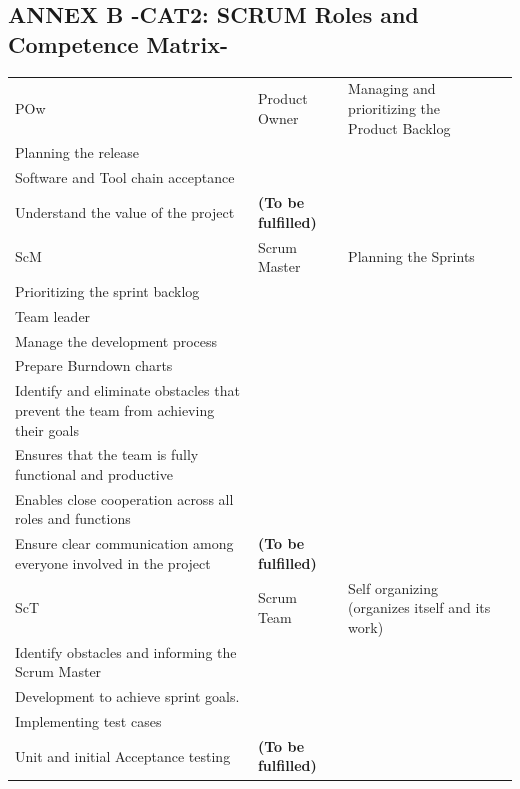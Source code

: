 \documentclass{template/openetcs_article}
\begin{document}
\begin{landscape}
\newpage
\subsection{ANNEX B -CAT2: SCRUM Roles and Competence Matrix-}
\begin{flushleft}
\begin{supertabular}[H]{|m{1cm}|m{4cm}|m{13cm}|m{7cm}|}
\hline
POw &
Product Owner &
\raggedright
Managing and prioritizing the Product Backlog\\
Planning the release\\
Software and Tool chain acceptance\\
Understand the value of the project
&
\textbf{(To be fulfilled)} \\\hline
ScM &
Scrum Master &
\raggedright
Planning the Sprints\\
Prioritizing the sprint backlog\\
Team leader\\
Manage the development process \\
Prepare Burndown charts\\
Identify and eliminate obstacles that prevent the team from achieving their goals \\
Ensures that the team is fully functional and productive\\
Enables close cooperation across all roles and functions\\
Ensure clear communication among everyone involved in the project
&
\textbf{(To be fulfilled)} \\\hline
ScT &
Scrum Team &
\raggedright
Self organizing (organizes itself and its work)\\
Identify obstacles and informing the Scrum Master \\
Development to achieve sprint goals.\\ 
Implementing test cases \\
Unit and initial Acceptance testing 
&
\textbf{(To be fulfilled)} \\\hline
\end{supertabular}
\end{flushleft}


\end{landscape}
\end{document}
